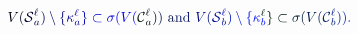 \documentclass[12pt]{article}
\begin{document}
\makeatletter
\renewcommand*{\@textcolor}[3]{%
  \protect\leavevmode
  \begingroup
    \color#1{#2}#3%
  \endgroup
}
\makeatother
\begin{displaymath}
\mathcolor[RGB]{0,0,15}{V} \mathcolor[RGB]{0,0,30}{(} \mathcal { \mathcolor[RGB]{0,0,45}{S} } _ { \mathcolor[RGB]{0,0,60}{a} } ^ { \mathcolor[RGB]{0,0,75}{\ell} } \mathcolor[RGB]{0,0,90}{)} \mathcolor[RGB]{0,0,105}{\setminus} \mathcolor[RGB]{0,0,120}{\{} \mathcolor[RGB]{0,0,135}{\kappa} _ { \mathcolor[RGB]{0,0,150}{a} } ^ { \mathcolor[RGB]{0,0,165}{\ell} } \mathcolor[RGB]{0,0,180}{\}} \mathcolor[RGB]{0,0,195}{\subset} \mathcolor[RGB]{0,0,210}{\sigma} \mathcolor[RGB]{0,0,225}{(} \mathcolor[RGB]{0,0,240}{V} \mathcolor[RGB]{0,0,255}{(} \mathcal { \mathcolor[RGB]{0,15,0}{C} } _ { \mathcolor[RGB]{0,15,15}{a} } ^ { \mathcolor[RGB]{0,15,30}{\ell} } \mathcolor[RGB]{0,15,45}{)} \mathcolor[RGB]{0,15,60}{)} \mathrm { ~ \mathcolor[RGB]{0,15,75}{a} \mathcolor[RGB]{0,15,90}{n} \mathcolor[RGB]{0,15,105}{d} ~ } \mathcolor[RGB]{0,15,120}{V} \mathcolor[RGB]{0,15,135}{(} \mathcal { \mathcolor[RGB]{0,15,150}{S} } _ { \mathcolor[RGB]{0,15,165}{b} } ^ { \mathcolor[RGB]{0,15,180}{\ell} } \mathcolor[RGB]{0,15,195}{)} \mathcolor[RGB]{0,15,210}{\setminus} \mathcolor[RGB]{0,15,225}{\{} \mathcolor[RGB]{0,15,240}{\kappa} _ { \mathcolor[RGB]{0,15,255}{b} } ^ { \mathcolor[RGB]{0,30,0}{\ell} } \mathcolor[RGB]{0,30,15}{\}} \mathcolor[RGB]{0,30,30}{\subset} \mathcolor[RGB]{0,30,45}{\sigma} \mathcolor[RGB]{0,30,60}{(} \mathcolor[RGB]{0,30,75}{V} \mathcolor[RGB]{0,30,90}{(} \mathcal { \mathcolor[RGB]{0,30,105}{C} } _ { \mathcolor[RGB]{0,30,120}{b} } ^ { \mathcolor[RGB]{0,30,135}{\ell} } \mathcolor[RGB]{0,30,150}{)} \mathcolor[RGB]{0,30,165}{)} \mathcolor[RGB]{0,30,180}{.}
\end{displaymath}
\end{document}
